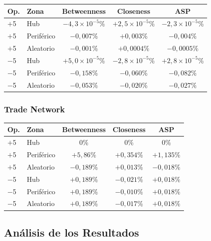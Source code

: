 \begin{center}
\begin{tabular}{llccc}
\toprule
\textbf{Op.} & \textbf{Zona} & \textbf{Betweenness} & \textbf{Closeness} & \textbf{ASP} \\
\midrule
$+$5 & Hub        & $-4{,}3\times10^{-5}$\% & $+2{,}5\times10^{-5}$\% & $-2{,}3\times10^{-5}$\% \\
$+$5 & Periférico & $-0{,}007$\%             & $+0{,}003$\%             & $-0{,}004$\% \\
$+$5 & Aleatorio  & $-0{,}001$\%             & $+0{,}0004$\%            & $-0{,}0005$\% \\
\midrule
$-$5 & Hub        & $+5{,}0\times10^{-5}$\% & $-2{,}8\times10^{-5}$\% & $+2{,}8\times10^{-5}$\% \\
$-$5 & Periférico & $-0{,}158$\%             & $-0{,}060$\%             & $-0{,}082$\% \\
$-$5 & Aleatorio  & $-0{,}053$\%             & $-0{,}020$\%             & $-0{,}027$\% \\
\bottomrule
\end{tabular}
\end{center}

\subsubsection*{Trade Network}

\begin{center}
\begin{tabular}{llccc}
\toprule
\textbf{Op.} & \textbf{Zona} & \textbf{Betweenness} & \textbf{Closeness} & \textbf{ASP} \\
\midrule
$+$5 & Hub        & $0$\%        & $0$\%        & $0$\%      \\
$+$5 & Periférico & $+5{,}86$\%  & $+0{,}354$\% & $+1{,}135$\% \\
$+$5 & Aleatorio  & $-0{,}189$\% & $+0{,}013$\% & $-0{,}018$\% \\
\midrule
$-$5 & Hub        & $+0{,}189$\% & $-0{,}021$\% & $+0{,}018$\% \\
$-$5 & Periférico & $+0{,}189$\% & $-0{,}010$\% & $+0{,}018$\% \\
$-$5 & Aleatorio  & $+0{,}189$\% & $-0{,}017$\% & $+0{,}018$\% \\
\bottomrule
\end{tabular}
\end{center}

\subsection{Análisis de los Resultados}


